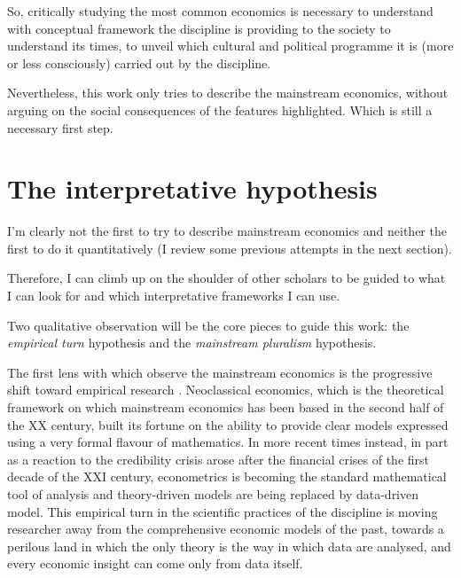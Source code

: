 \documentclass[a4paper, 11pt, headings=standardclasses, tablecaptionsbelow]{scrartcl}
\begin{document}
So, critically studying the most common economics is necessary to understand with conceptual framework the discipline is providing to the society to understand its times, to unveil which cultural and political programme it is (more or less consciously) carried out by the discipline.

Nevertheless, this work only tries to describe the mainstream economics, without arguing on the social consequences of the features highlighted. Which is still a necessary first step.

\section{The interpretative hypothesis}
I'm clearly not the first to try to describe mainstream economics and neither the first to do it quantitatively (I review some previous attempts in the next section).

Therefore, I can climb up on the shoulder of other scholars to be guided to what I can look for and which interpretative frameworks I can use.

Two qualitative observation will be the core pieces to guide this work: the \textit{empirical turn} hypothesis and the \textit{mainstream pluralism} hypothesis.

The first lens with which observe the mainstream economics is the progressive shift toward empirical research \parencite{backhouse2000,backhouse2016,backhouse2017,cherrier2022}.
Neoclassical economics, which is the theoretical framework on which mainstream economics has been based in the second half of the XX century, built its fortune on the ability to provide clear models expressed using a very formal flavour of mathematics.
In more recent times instead, in part as a reaction to the credibility crisis arose after the financial crises of the first decade of the XXI century, econometrics is becoming the standard mathematical tool of analysis and theory-driven models are being replaced by data-driven model.
This empirical turn in the scientific practices of the discipline is moving researcher away from the comprehensive economic models of the past, towards a perilous land in which the only theory is the way in which data are analysed, and every economic insight can come only from data itself.
\end{document}
